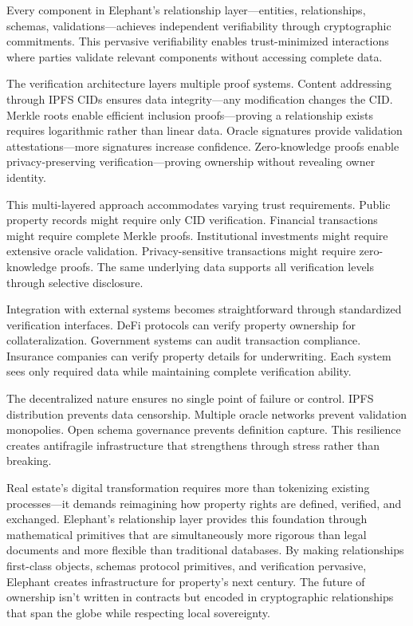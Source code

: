 Every component in Elephant's relationship layer—entities, relationships, schemas, validations—achieves independent verifiability through cryptographic commitments. This pervasive verifiability enables trust-minimized interactions where parties validate relevant components without accessing complete data.

The verification architecture layers multiple proof systems. Content addressing through IPFS CIDs ensures data integrity—any modification changes the CID. Merkle roots enable efficient inclusion proofs—proving a relationship exists requires logarithmic rather than linear data. Oracle signatures provide validation attestations—more signatures increase confidence. Zero-knowledge proofs enable privacy-preserving verification—proving ownership without revealing owner identity.

This multi-layered approach accommodates varying trust requirements. Public property records might require only CID verification. Financial transactions might require complete Merkle proofs. Institutional investments might require extensive oracle validation. Privacy-sensitive transactions might require zero-knowledge proofs. The same underlying data supports all verification levels through selective disclosure.

Integration with external systems becomes straightforward through standardized verification interfaces. DeFi protocols can verify property ownership for collateralization. Government systems can audit transaction compliance. Insurance companies can verify property details for underwriting. Each system sees only required data while maintaining complete verification ability.

The decentralized nature ensures no single point of failure or control. IPFS distribution prevents data censorship. Multiple oracle networks prevent validation monopolies. Open schema governance prevents definition capture. This resilience creates antifragile infrastructure that strengthens through stress rather than breaking.

Real estate's digital transformation requires more than tokenizing existing processes—it demands reimagining how property rights are defined, verified, and exchanged. Elephant's relationship layer provides this foundation through mathematical primitives that are simultaneously more rigorous than legal documents and more flexible than traditional databases. By making relationships first-class objects, schemas protocol primitives, and verification pervasive, Elephant creates infrastructure for property's next century. The future of ownership isn't written in contracts but encoded in cryptographic relationships that span the globe while respecting local sovereignty.